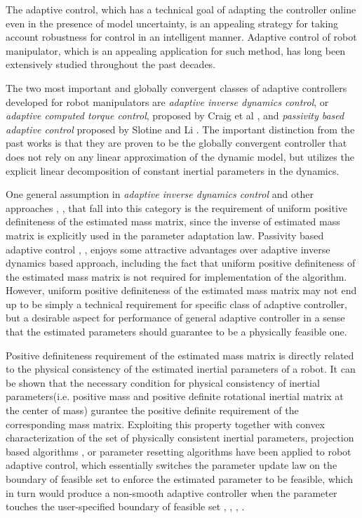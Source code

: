 \documentclass[letterpaper, 10 pt, conference]{ieeeconf}  %
\begin{document}
The adaptive control, which has a technical goal of adapting the controller online even in the presence of model uncertainty, is an appealing strategy for taking account robustness for control in an intelligent manner. Adaptive control of robot manipulator, which is an appealing application for such method, has long been extensively studied throughout the past decades.

The two most important and globally convergent classes of adaptive controllers developed for robot manipulators are {\em adaptive inverse dynamics control}, or {\em adaptive computed torque control}, proposed by Craig et al \cite{Craig_AdaptiveControl}, and {\em passivity based adaptive control} proposed by Slotine and Li \cite{Slotine_AdaptiveControl}. The important distinction from the past works is that they are proven to be the globally convergent controller that does not rely on any linear approximation of the dynamic model, but utilizes the explicit linear decomposition of constant inertial parameters in the dynamics. 

One general assumption in {\em adaptive inverse dynamics control} \cite{Craig_AdaptiveControl} and other approaches \cite{ACTC_task_space}, \cite{ACTC_Middleton}, \cite{ACTC_Spong} that fall into this category is the requirement of uniform positive definiteness of the estimated mass matrix, since the inverse of estimated mass matrix is explicitly used in the parameter adaptation law. Passivity based adaptive control \cite{Slotine_AdaptiveControl}, \cite{Slotine_Composite}, \cite{Brogliato_PBAC_unified}  enjoys some attractive advantages over adaptive inverse dynamics based approach, including the fact that uniform positive definiteness of the estimated mass matrix is not required for implementation of the algorithm. However, uniform positive definiteness of the estimated mass matrix may not end up to be simply a technical requirement for specific class of adaptive controller, but a desirable aspect for performance of general adaptive controller in a sense that the estimated parameters should guarantee to be a physically feasible one.

Positive definiteness requirement of the estimated mass matrix is directly related to the physical consistency of the estimated inertial parameters of a robot. It can be shown that the necessary condition for physical consistency of inertial parameters(i.e. positive mass and positive definite rotational inertial matrix at the center of mass) gurantee the positive definite requirement of the corresponding mass matrix. Exploiting this property together with convex characterization of the set of physically consistent inertial parameters, projection based algorithms \cite{Ioannou_RAC}, or parameter resetting algorithms have been applied to robot adaptive control, which essentially switches the parameter update law on the boundary of feasible set to enforce the estimated parameter to be feasible, which in turn would produce a non-smooth adaptive controller when the parameter touches the user-specified boundary of feasible set \cite{Craig_AdaptiveControl}, \cite{Slotine_Indirect}, \cite{Wang_Projection}, \cite{Goodwin_Projection}.
\end{document}
